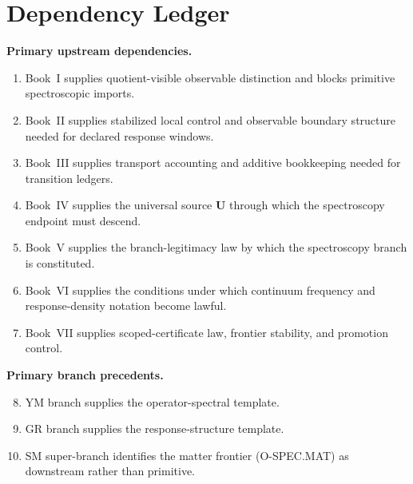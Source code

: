 \documentclass[12pt,oneside]{amsbook}
\theoremstyle{plain}
\theoremstyle{definition}
\theoremstyle{remark}
\begin{document}
\section{Dependency Ledger}\label{sec:spec-dep-ledger}

\textbf{Primary upstream dependencies.}
\begin{enumerate}[label=\textup{(\arabic*)}]
 \item Book~I supplies quotient-visible observable distinction and blocks
 primitive spectroscopic imports.
 \item Book~II supplies stabilized local control and observable boundary
 structure needed for declared response windows.
 \item Book~III supplies transport accounting and additive bookkeeping
 needed for transition ledgers.
 \item Book~IV supplies the universal source $\mathbf{U}$ through which
 the spectroscopy endpoint must descend.
 \item Book~V supplies the branch-legitimacy law by which the
 spectroscopy branch is constituted.
 \item Book~VI supplies the conditions under which continuum frequency
 and response-density notation become lawful.
 \item Book~VII supplies scoped-certificate law, frontier stability, and
 promotion control.
\end{enumerate}

\textbf{Primary branch precedents.}
\begin{enumerate}[label=\textup{(\arabic*)}]
 \setcounter{enumi}{7}
 \item YM branch supplies the operator-spectral template.
 \item GR branch supplies the response-structure template.
 \item SM super-branch identifies the matter frontier
 (O-SPEC.MAT) as downstream rather than primitive.
\end{enumerate}
\end{document}
